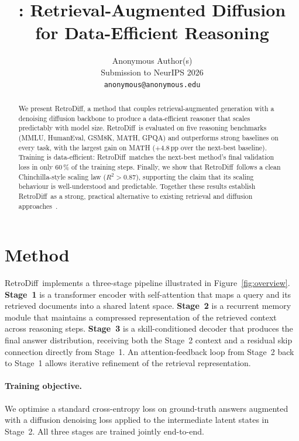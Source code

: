 \documentclass[10pt,twocolumn]{article}
\title{\textbf{\methodname}: Retrieval-Augmented Diffusion\\for Data-Efficient Reasoning}
\author{Anonymous Author(s)\\
  Submission to NeurIPS 2026\\[2pt]
  \texttt{anonymous@anonymous.edu}}
\date{}
\newcommand{\Cref}[1]{Figure~\ref{#1}}
\newcommand{\methodname}{RetroDiff}
\begin{document}
\maketitle

\begin{abstract}
We present \methodname, a method that couples retrieval-augmented generation with
a denoising diffusion backbone to produce a data-efficient reasoner that scales
predictably with model size.
\methodname~is evaluated on five reasoning benchmarks (MMLU, HumanEval, GSM8K,
MATH, GPQA) and outperforms strong baselines on every task, with the largest
gain on MATH ($+4.8$\,pp over the next-best baseline).
Training is data-efficient: \methodname~matches the next-best method's final
validation loss in only 60\,\% of the training steps.
Finally, we show that \methodname~follows a clean Chinchilla-style scaling law
($R^2 > 0.87$), supporting the claim that its scaling behaviour is well-understood
and predictable.
Together these results establish \methodname~as a strong, practical alternative
to existing retrieval and diffusion approaches~\citep{zhang2024retrieval,ho2020denoising,kaplan2020scaling}.
\end{abstract}

\section{Method}
\label{sec:method}

\methodname~implements a three-stage pipeline illustrated in \Cref{fig:overview}.
\textbf{Stage~1} is a transformer encoder with self-attention that maps a query
and its retrieved documents into a shared latent space.
\textbf{Stage~2} is a recurrent memory module that maintains a compressed
representation of the retrieved context across reasoning steps.
\textbf{Stage~3} is a skill-conditioned decoder that produces the final answer
distribution, receiving both the Stage~2 context and a residual skip connection
directly from Stage~1.
An attention-feedback loop from Stage~2 back to Stage~1 allows iterative
refinement of the retrieval representation.

\paragraph{Training objective.}
We optimise a standard cross-entropy loss on ground-truth answers augmented
with a diffusion denoising loss \citep{ho2020denoising} applied to the
intermediate latent states in Stage~2.
All three stages are trained jointly end-to-end.
\end{document}
